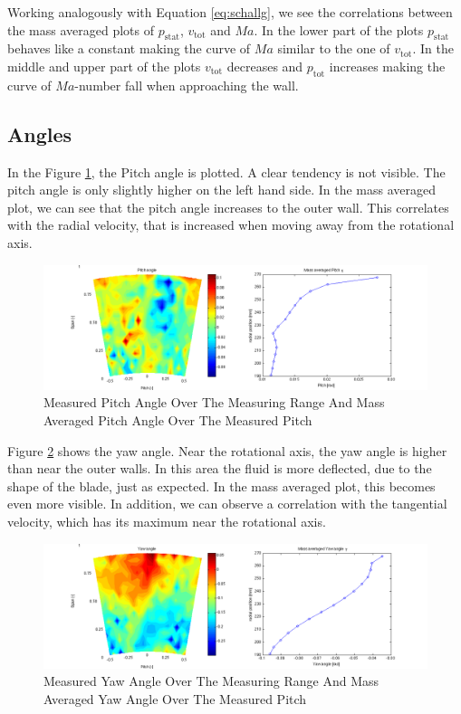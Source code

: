 Working analogously with Equation \ref{eq:schallg}, we see the correlations between the mass averaged plots of $p_\text{stat}$, $v_\text{tot}$ and $Ma$. In the lower part of the plots $p_\text{stat}$ behaves like a constant making the curve of $Ma$ similar to the one of $v_\text{tot}$. In the middle and upper part of the plots $v_\text{tot}$ decreases and $p_\text{tot}$ increases making the curve of $Ma$-number fall when approaching the wall. 

\subsection{Angles}

In the Figure \ref{fig:pitch}, the Pitch angle is plotted. A clear tendency is not visible. The pitch angle is only slightly higher on the left hand side. In the mass averaged plot, we can see that the pitch angle increases to the outer wall. This correlates with the radial velocity, that is increased when moving away from the rotational axis.
 
\begin{figure}[H]
\centering
\includegraphics[trim = 110px 0px 80px 0px, clip = true,width=\textwidth]{pics/pitch.png}
\caption{Measured Pitch Angle Over The Measuring Range And Mass Averaged Pitch Angle Over The Measured Pitch}
\label{fig:pitch}
\end{figure}

Figure \ref{fig:yaw} shows the yaw angle. Near the rotational axis, the yaw angle is higher than near the outer walls. In this area the fluid is more deflected, due to the shape of the blade, just as expected. In the mass averaged plot, this becomes even more visible. In addition, we can observe a correlation with the tangential velocity,  which has its maximum near the rotational axis.

\begin{figure}[H]
\centering
\includegraphics[trim = 110px 0px 80px 0px, clip = true,width=\textwidth]{pics/yaw.png}
\caption{Measured Yaw Angle Over The Measuring Range And Mass Averaged Yaw Angle Over The Measured Pitch}
\label{fig:yaw}
\end{figure}

